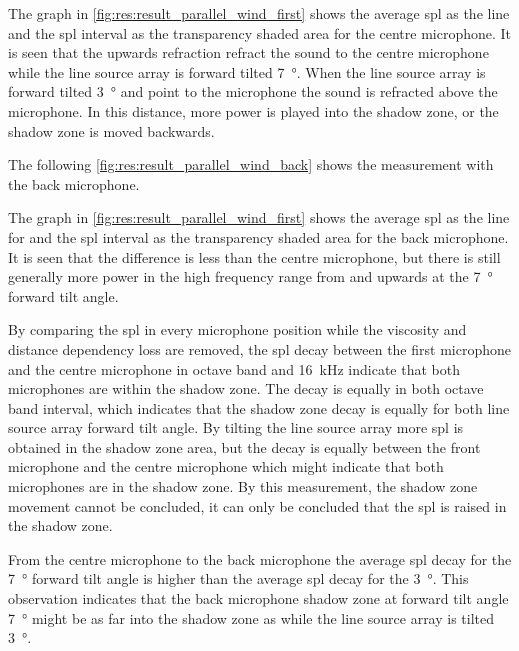   
  
 
 
 The graph in \autoref{fig:res:result_parallel_wind_first} shows the average \gls{spl} as the line  and the \gls{spl} interval as the transparency shaded area for the centre microphone. It is seen that the upwards refraction refract the sound to the centre microphone while the line source array is forward tilted \SI{7}{\degree}. When the line source array is forward tilted \SI{3}{\degree} and point to the microphone the sound is refracted above the microphone. In this distance, more power is played into the shadow zone, or the shadow zone is moved backwards. 

The following \autoref{fig:res:result_parallel_wind_back} shows the measurement with the back microphone.
 
 
  
   
The graph in \autoref{fig:res:result_parallel_wind_first} shows the average \gls{spl} as the line for and the \gls{spl} interval as the transparency shaded area for the back microphone. It is seen that the difference is less than the centre microphone, but there is still generally more power in the high frequency range from  and upwards at the \SI{7}{\degree} forward tilt angle.   


By comparing the \gls{spl} in every microphone position while the viscosity and distance dependency loss are removed, the \gls{spl} decay between the first microphone and the centre microphone in octave band  and \SI{16}{\kilo\hertz} indicate that both microphones are within the shadow zone. The decay is equally in both octave band interval, which indicates that the shadow zone decay is equally for both line source array forward tilt angle. By tilting the line source array more \gls{spl} is obtained in the shadow zone area, but the decay is equally between the front microphone and the centre microphone which might indicate that both microphones are in the shadow zone. By this measurement, the shadow zone movement cannot be concluded, it can only be concluded that the \gls{spl} is raised in the shadow zone. 

From the centre microphone to the back microphone the average \gls{spl} decay for the \SI{7}{\degree} forward tilt angle is higher than the average \gls{spl} decay for the \SI{3}{\degree}. This observation indicates that the back microphone shadow zone at forward tilt angle \SI{7}{\degree} might be as far into the shadow zone as while the line source array is tilted \SI{3}{\degree}.
